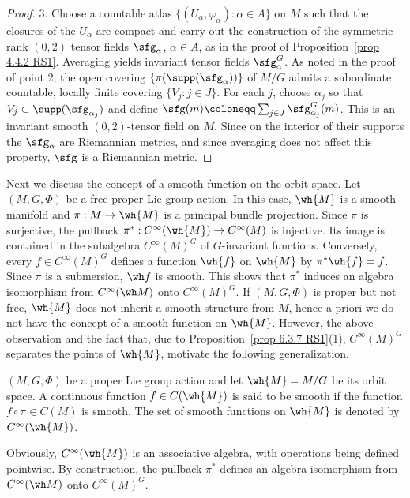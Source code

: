 \begin{proof}
    3. Choose a countable atlas $\{(U_\alpha,\varphi_\alpha):\alpha\in A\}$ on $M$ such that the closures of the $U_\alpha$ are compact and carry out the construction of the symmetric rank $(0,2)$ tensor fields $\sfg_\alpha$, $\alpha\in A$, as in the proof of Proposition~\ref{prop 4.4.2 RS1}. Averaging yields invariant tensor fields $\sfg_\alpha^G$. As noted in the proof of point 2, the open covering $\{\pi(\supp(\sfg_\alpha))\}$ of $M\slash G$ admits a subordinate countable, locally finite covering $\{V_j:j\in J\}$. For each $j$, choose $\alpha_j$ so that $V_j\subset \supp(\sfg_{\alpha_j})$ and define $\sfg(m)\coloneqq\sum_{j\in J}\sfg_{\alpha_j}^G(m)$. This is an invariant smooth $(0,2)$-tensor field on $M$. Since on the interior of their supports the $\sfg_\alpha$ are Riemannian metrics, and since averaging does not affect this property, $\sfg$ is a Riemannian metric.
\end{proof}

Next we discuss the concept of a smooth function on the orbit space. Let $(M,G,\Phi)$ be a free proper Lie group action. In this case, $\wh{M}$ is a smooth manifold and $\pi:M\to \wh{M}$ is a principal bundle projection. Since $\pi$ is surjective, the pullback $\pi^\ast:C^\infty(\wh{M})\to C^\infty(M)$ is injective. Its image is contained in the subalgebra $C^\infty(M)^G$ of $G$-invariant functions. Conversely, every $f\in C^\infty(M)^G$ defines a function $\wh{f}$ on $\wh{M}$ by $\pi^\ast\wh{f}=f$. Since $\pi $ is a submersion, $\wh f$ is smooth. This shows that $\pi^\ast$ induces an algebra isomorphism from $C^\infty(\wh M)$ onto $C^\infty(M)^G$. If $(M,G,\Phi)$ is proper but not free, $\wh{M}$ does not inherit a smooth structure from $M$, hence a priori we do not have the concept of a smooth function on $\wh{M}$. However, the above observation and the fact that, due to Proposition~\ref{prop 6.3.7 RS1}(1), $C^\infty(M)^G$ separates the points of $\wh{M}$, motivate the following generalization.


\begin{defn}
    $(M,G,\Phi)$ be a proper Lie group action and let $\wh{M}=M\slash G$ be its orbit space.
    A continuous function $f\in C(\wh{M})$ is said to be smooth if the function $f\circ\pi\in C(M)$ is smooth. The set of smooth functions on $\wh{M}$ is denoted by $C^\infty(\wh{M})$.
\end{defn}

Obviously, $C^\infty(\wh{M})$ is an associative algebra, with operations being defined pointwise. By construction, the pullback $\pi^\ast$ defines an algebra isomorphism from $C^\infty(\wh M)$ onto $C^\infty(M)^G$.

